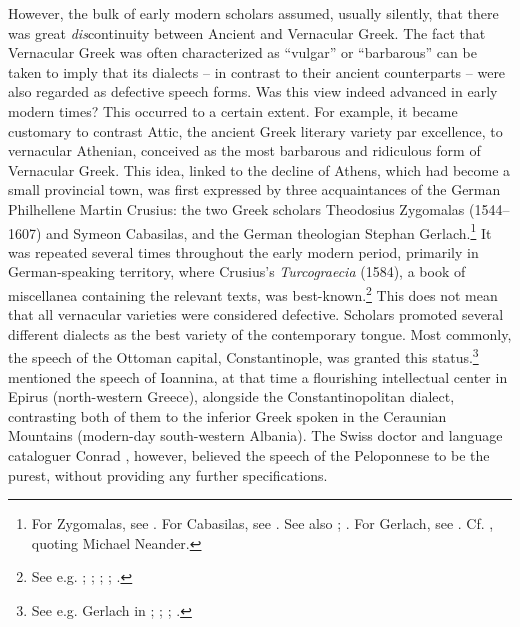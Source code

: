 However, the bulk of early modern scholars assumed, usually silently, that there was great \textit{dis}continuity between Ancient and Vernacular Greek. The fact that Vernacular Greek was often characterized as “vulgar” or “barbarous” can be taken to imply that its dialects – in contrast to their ancient counterparts – were also regarded as defective speech forms. Was this view indeed advanced in early modern times? This occurred to a certain extent. For example, it became customary to contrast Attic, the ancient Greek literary variety par excellence, to vernacular Athenian, conceived as the most barbarous and ridiculous form of Vernacular Greek. This idea, linked to the decline of Athens, which had become a small provincial town, was first expressed by three acquaintances of the German Philhellene Martin Crusius: the two Greek scholars Theodosius Zygomalas (1544–1607) and Symeon Cabasilas, and the German theologian Stephan Gerlach.\footnote{For Zygomalas, see \citet[99, 216]{Crusius1584}. For Cabasilas, see \citet[461]{Crusius1584}. See also \citet[91]{Rotolo1973}; \citet[185, 189–190]{Rhoby2002}. For Gerlach, see \citet[489]{Crusius1584}. Cf. \citet[194]{Ben-tov2013}, quoting Michael Neander.} It was repeated several times throughout the early modern period, primarily in German-speaking territory, where Crusius’s \textit{Turcograecia} (1584), a book of miscellanea containing the relevant texts, was best-known.\footnote{See e.g. \citet[215]{Becman1673}; \citet[\textsc{a.3}\textsc{\textsuperscript{v}}]{Rodigast1685}; \citet[\textsc{ii}.824]{Hofmann1698}; \citet[1135]{[frisch]1730}; \citet[9]{Gedike1782}.} This does not mean that all vernacular varieties were considered defective. Scholars promoted several different dialects as the best variety of the contemporary tongue. Most commonly, the speech of the Ottoman capital, Constantinople, was granted this status.\footnote{See e.g. Gerlach in \citet[489]{Crusius1584}; \citet[215]{Becman1673}; \citet[74]{Blount1680}; \citet[vii]{Du1688}.} \citet[a.4\textsc{\textsuperscript{v}}, a.7\textsc{\textsuperscript{r}}]{Tribbechow1705} mentioned the speech of Ioannina, at that time a flourishing intellectual center in Epirus (north-western Greece), alongside the Constantinopolitan dialect, contrasting both of them to the inferior Greek spoken in the Ceraunian Mountains (modern-day south-western Albania). The Swiss doctor and language cataloguer Conrad \citet[47\textsc{\textsuperscript{r}}]{Gessner1555}, however, believed the speech of the Peloponnese to be the purest, without providing any further specifications.


